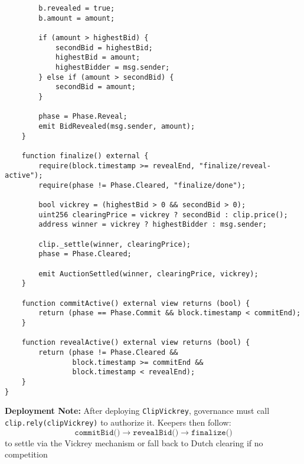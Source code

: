 \documentclass[11pt]{article}
\begin{document}
\begin{verbatim}
        b.revealed = true;
        b.amount = amount;

        if (amount > highestBid) {
            secondBid = highestBid;
            highestBid = amount;
            highestBidder = msg.sender;
        } else if (amount > secondBid) {
            secondBid = amount;
        }

        phase = Phase.Reveal;
        emit BidRevealed(msg.sender, amount);
    }

    function finalize() external {
        require(block.timestamp >= revealEnd, "finalize/reveal-active");
        require(phase != Phase.Cleared, "finalize/done");

        bool vickrey = (highestBid > 0 && secondBid > 0);
        uint256 clearingPrice = vickrey ? secondBid : clip.price();
        address winner = vickrey ? highestBidder : msg.sender;

        clip._settle(winner, clearingPrice);
        phase = Phase.Cleared;

        emit AuctionSettled(winner, clearingPrice, vickrey);
    }

    function commitActive() external view returns (bool) {
        return (phase == Phase.Commit && block.timestamp < commitEnd);
    }

    function revealActive() external view returns (bool) {
        return (phase != Phase.Cleared &&
                block.timestamp >= commitEnd &&
                block.timestamp < revealEnd);
    }
}
\end{verbatim}

\bigskip

\noindent\textbf{Deployment Note:}  
After deploying \texttt{ClipVickrey}, governance must call \texttt{clip.rely(clipVickrey)} to authorize it. Keepers then follow:
\[
\texttt{commitBid()} \rightarrow \texttt{revealBid()} \rightarrow \texttt{finalize()}
\]
to settle via the Vickrey mechanism or fall back to Dutch clearing if no competition 

\clearpage
\printbibliography
\end{document}
